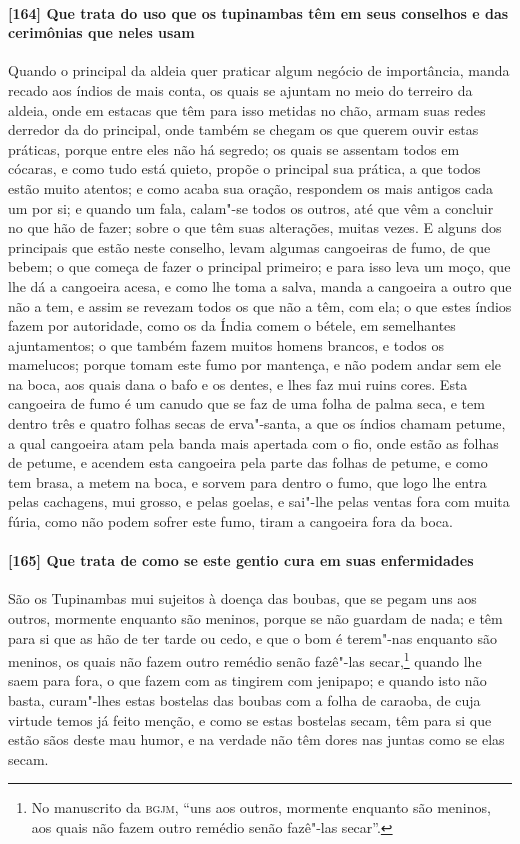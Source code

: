 \begin{linenumbers}
\paragraph{[164] Que trata do uso que os tupinambas têm em seus conselhos e das cerimônias
que neles usam}\quad
Quando o principal da aldeia quer praticar algum negócio de importância, manda recado aos
índios de mais conta, os quais se ajuntam no meio do terreiro da aldeia, onde em estacas
que têm para isso metidas no chão, armam suas redes derredor da do principal, onde também
se chegam os que querem ouvir estas práticas, porque entre eles não há segredo; os quais
se assentam todos em cócaras, e como tudo está quieto, propõe o principal sua prática, a
que todos estão muito atentos; e como acaba sua oração, respondem os mais antigos cada um
por si; e quando um fala, calam"-se todos os outros, até que vêm a concluir no que hão de
fazer; sobre o que têm suas alterações, muitas vezes. E alguns dos principais que estão
neste conselho, levam algumas cangoeiras de fumo, de que bebem; o que começa de fazer o
principal primeiro; e para isso leva um moço, que lhe dá a cangoeira acesa, e como lhe
toma a salva, manda a cangoeira a outro que não a tem, e assim se revezam todos os que não
a têm, com ela; o que estes índios fazem por autoridade, como os da Índia comem o bétele,
em semelhantes ajuntamentos; o que também fazem muitos homens brancos, e todos os
mamelucos; porque tomam este fumo por mantença, e não podem andar sem ele na boca, aos
quais dana o bafo e os dentes, e lhes faz mui ruins cores. Esta cangoeira de fumo é um
canudo que se faz de uma folha de palma seca, e tem dentro três e quatro folhas secas de
erva"-santa, a que os índios chamam petume, a qual cangoeira atam pela banda mais apertada
com o fio, onde estão as folhas de petume, e acendem esta cangoeira pela parte das folhas
de petume, e como tem brasa, a metem na boca, e sorvem para dentro o fumo, que logo lhe
entra pelas cachagens, mui grosso, e pelas goelas, e sai"-lhe pelas ventas fora com muita
fúria, como não podem sofrer este fumo, tiram a cangoeira fora da boca.

\paragraph{[165] Que trata de como se este gentio cura em suas \mbox{enfermidades}}\quad
São os Tupinambas mui sujeitos à doença das boubas, que se pegam uns aos outros, mormente
enquanto são meninos, porque se não guardam de nada; e têm para si que as hão de ter tarde
ou cedo, e que o bom é terem"-nas enquanto são meninos, os quais não fazem outro remédio
senão fazê"-las secar,\footnote{ No manuscrito da \textsc{bgjm}, ``uns aos outros, mormente
enquanto são meninos, aos quais não fazem outro remédio senão fazê"-las secar''.} quando
lhe saem para fora, o que fazem com as tingirem com jenipapo; e quando isto não basta,
curam"-lhes estas bostelas das boubas com a folha de caraoba, de cuja virtude temos já
feito menção, e como se estas bostelas secam, têm para si que estão sãos deste mau humor,
e na verdade não têm dores nas juntas como se elas secam.


\end{linenumbers}
